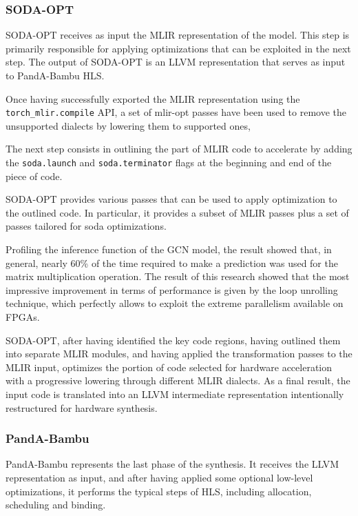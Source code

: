 \documentclass[11pt,a4paper,twocolumn]{article}
\begin{document}
\subsubsection*{SODA-OPT}
\label{subsec:soda-opt}%

SODA-OPT receives as input the MLIR representation of the model.
This step is primarily responsible for applying optimizations that can be exploited in the next step.
The output of SODA-OPT is an LLVM representation that serves as input to PandA-Bambu HLS\@.

Once having successfully exported the MLIR representation using the \lstinline{torch_mlir.compile} API, a set of mlir-opt passes have been used to remove the unsupported dialects by lowering them to supported ones,

The next step consists in outlining the part of MLIR code to accelerate by adding the \lstinline{soda.launch} and \lstinline{soda.terminator} flags at the beginning and end of the piece of code.

SODA-OPT provides various passes that can be used to apply optimization to the outlined code.
In particular, it provides a subset of MLIR passes plus a set of passes tailored for soda optimizations.

Profiling the inference function of the GCN model, the result showed that, in general, nearly 60\% of the time required to make a prediction was used for the matrix multiplication operation.
The result of this research showed that the most impressive improvement in terms of performance is given by the loop unrolling technique, which perfectly allows to exploit the extreme parallelism available on FPGAs.

SODA-OPT, after having identified the key code regions, having outlined them into separate MLIR modules, and having applied the transformation passes to the MLIR input, optimizes the portion of code selected for hardware acceleration with a progressive lowering through different MLIR dialects.
As a final result, the input code is translated into an LLVM intermediate representation intentionally restructured for hardware synthesis.

\subsubsection*{PandA-Bambu}
\label{subsec:bambu}%

PandA-Bambu represents the last phase of the synthesis.
It receives the LLVM representation as input, and after having applied some optional low-level optimizations, it performs the typical steps of HLS, including allocation, scheduling and binding.
\end{document}
